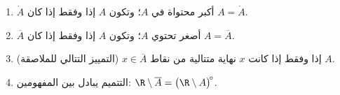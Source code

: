 \begin{proposition}\label{prop:b1:topology:closureprops}
\begin{enumerate}
  \item $\mathring A$ أكبر  محتواة في $A$؛ وتكون $A$
         إذا وفقط إذا كان $A = \mathring A$.
  \item $\overline A$ أصغر  تحتوي $A$؛ وتكون $A$
         إذا وفقط إذا كان $A = \overline A$.
  \item (التمييز التتالي للملاصقة) $x \in \overline
        A$ إذا وفقط إذا كانت $x$ نهاية متتالية من نقاط
        $A$.
  \item التتميم يبادل بين المفهومين: $\R \setminus
        \overline A = \bigl(\R \setminus A\bigr)^{\!\circ}$.
\end{enumerate}
\end{proposition}

